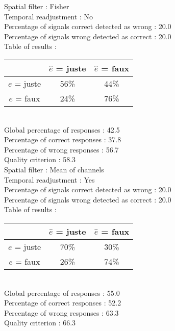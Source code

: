 Spatial filter : Fisher \\
Temporal readjustment : No \\
Percentage of signals correct detected as wrong :   20.0 \\
Percentage of signals wrong detected as correct :   20.0 \\
Table of results : \\
\begin{tabular}{|c|c|c|}
\hline				& $\hat{e}$ = juste & $\hat{e}$ = faux \\
\hline  $e$ = juste	&     56\%			&     44\%		\\
\hline  $e$ = faux	&     24\%			&     76\%		\\
\hline
\end{tabular}\\
Global percentage of responses :   42.5 \\
Percentage of correct responses :   37.8 \\
Percentage of wrong responses :   56.7 \\
Quality criterion :   58.3 \\

Spatial filter : Mean of channels \\
Temporal readjustment : Yes \\
Percentage of signals correct detected as wrong :   20.0 \\
Percentage of signals wrong detected as correct :   20.0 \\
Table of results : \\
\begin{tabular}{|c|c|c|}
\hline				& $\hat{e}$ = juste & $\hat{e}$ = faux \\
\hline  $e$ = juste	&     70\%			&     30\%		\\
\hline  $e$ = faux	&     26\%			&     74\%		\\
\hline
\end{tabular}\\
Global percentage of responses :   55.0 \\
Percentage of correct responses :   52.2 \\
Percentage of wrong responses :   63.3 \\
Quality criterion :   66.3 \\

